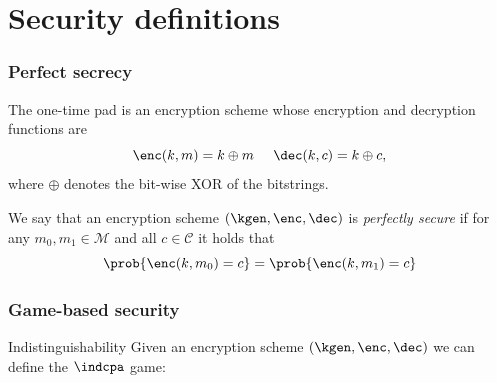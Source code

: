 \documentclass{beamer}
\begin{document}
    
    \section{Security definitions}
    
    \begin{frame}
        \frametitle{Perfect secrecy}
        
        \begin{definition}
            The one-time pad is an encryption scheme whose encryption and decryption functions are
            $$ \enc(k,m)=k\oplus m\;\;\;\;\; \dec(k,c)=k\oplus c,$$
            where $\oplus$ denotes the bit-wise XOR of the bitstrings.
        \end{definition}
    
        \begin{definition}
            We say that an encryption scheme $(\kgen,\enc,\dec)$ is \emph{perfectly secure} if for any $m_0,m_1\in\mathcal M$ and all $c\in\mathcal C$ it holds that 
            $$\prob{\enc(k,m_0)=c} = \prob{\enc(k,m_1)=c}$$
        \end{definition}
    
    \end{frame}


    \begin{frame}
        \frametitle{Game-based security}
        
        \begin{block}{Indistinguishability}
            Given an encryption scheme $(\kgen,\enc,\dec)$ we can define the $\indcpa$ game:
            
            \begin{center}
            \end{center}
        \end{block}
    
    \end{frame}
\end{document}
